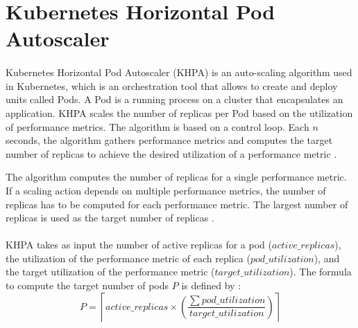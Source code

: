 \section{Kubernetes Horizontal Pod Autoscaler}
\label{sec:04_background_khpa}
\paragraph{}
Kubernetes Horizontal Pod Autoscaler (KHPA) is an auto-scaling algorithm used in Kubernetes, which is an orchestration tool that allows to create and deploy units called Pods. A Pod is a running process on a cluster that encapsulates an application.
KHPA scales the number of replicas per Pod based on the utilization of performance metrics.
The algorithm is based on a control loop. Each $n$ seconds, the algorithm gathers performance metrics and computes the target number of replicas to achieve the desired utilization of a performance metric \cite{Casalicchio2017AutoScaleCont}.


The algorithm computes the number of replicas for a single performance metric. If a scaling action depends on multiple performance metrics, the number of replicas has to be computed for each performance metric. The largest number of replicas is used as the target number of replicas \cite{Kubernetes2021Docs}.


\paragraph{}
KHPA takes as input the number of active replicas for a pod ($active\_replicas$), the utilization of the performance metric of each replica ($pod\_utilization$), and the target utilization of the performance metric ($target\_utilization$).
The formula to compute the target number of pods $P$ is defined by \cite{Kubernetes2021Docs}:
\begin{equation}
P = \left \lceil active\_replicas \times \left ( \frac{\sum pod\_utilization}{target\_utilization} \right ) \right \rceil
\label{eq:04_background_khpa_equation}
\end{equation}

